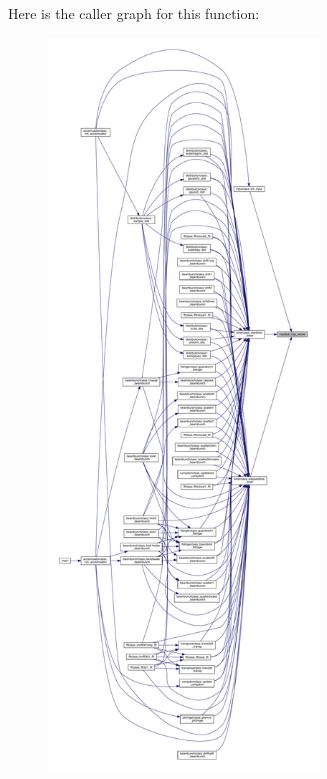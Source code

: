 Here is the caller graph for this function\+:\nopagebreak
\begin{figure}[H]
\begin{center}
\leavevmode
\includegraphics[height=550pt]{namespacempistub_a2456432a60801629e19273ebe4114bc9_icgraph}
\end{center}
\end{figure}
